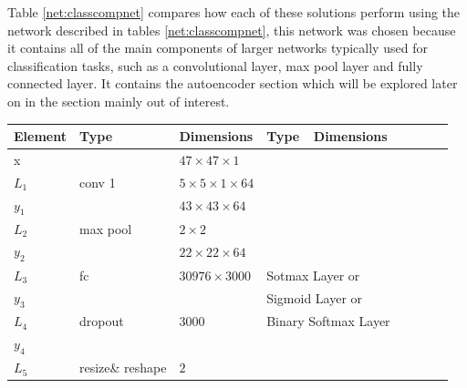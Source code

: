     Table \ref{net:classcompnet} compares how each of these solutions perform using the network described in
    tables \ref{net:classcompnet}, this network was chosen because it contains all of the main
    components of larger networks typically used for classification tasks, such as a convolutional
    layer, max pool layer and fully connected layer. It contains the autoencoder section which will be
    explored later on in the section mainly out of interest.

    \begin{table}[h!]
    \centering
    {\footnotesize
    \begin{tabular}{|lllllllll|}
    \hline
    \multicolumn{1}{|l|}{Element} & Type     & \multicolumn{1}{l|}{Dimensions}                     & Type     & \multicolumn{1}{l|}{Dimensions} \\ \hline
    \multicolumn{1}{|l|}{x}       &          & \multicolumn{1}{l|}{$47\times47\times1$}            &          & \multicolumn{1}{l|}{}          \\ \hline
    \multicolumn{1}{|l|}{$L_1$}   & conv 1   & \multicolumn{1}{l|}{$5\times 5\times1\times 64$}    &          & \multicolumn{1}{l|}{}          \\
    \multicolumn{1}{|l|}{$y_1$}   &          & \multicolumn{1}{l|}{$43\times43\times64$}           &          & \multicolumn{1}{l|}{}          \\ \hline
    \multicolumn{1}{|l|}{$L_2$}   & max pool & \multicolumn{1}{l|}{$2\times 2$}                    &          & \multicolumn{1}{l|}{}          \\
    \multicolumn{1}{|l|}{$y_2$}   &          & \multicolumn{1}{l|}{$22\times22\times 64$}          &          & \multicolumn{1}{l|}{}          \\ \hline
    \multicolumn{1}{|l|}{$L_3$}   & fc       & \multicolumn{1}{l|}{$30976\times3000$}              & \multicolumn{2}{l|}{Sotmax Layer or}      \\
    \multicolumn{1}{|l|}{$y_3$}   &          & \multicolumn{1}{l|}{}                               & \multicolumn{2}{l|}{Sigmoid Layer or}     \\
    \multicolumn{1}{|l|}{$L_4$}   & dropout  & \multicolumn{1}{l|}{$3000$}                         & \multicolumn{2}{l|}{Binary Softmax Layer} \\
    \multicolumn{1}{|l|}{$y_4$}   &          & \multicolumn{1}{l|}{}                               &          & \multicolumn{1}{l|}{}          \\ \hline
    \multicolumn{1}{|l|}{$L_5$}   & resize\& reshape & \multicolumn{1}{l|}{$2$}                    &          & \multicolumn{1}{l|}{}          \\

\end{tabular}}
\end{table}
